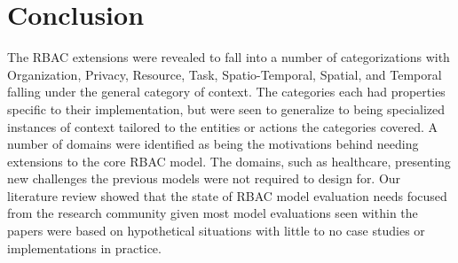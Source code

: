 \section{Conclusion} \label{sec:conclusion}

The RBAC extensions were revealed to fall into a number of categorizations with Organization, Privacy, Resource, Task, Spatio-Temporal, Spatial, and Temporal falling under the general category of context.
The categories each had properties specific to their implementation, but were seen to generalize to being specialized instances of context tailored to the entities or actions the categories covered.
A number of domains were identified as being the motivations behind needing extensions to the core RBAC model.  The domains, such as healthcare, presenting new challenges the previous models were not
required to design for.  Our literature review showed that the state of RBAC model evaluation needs focused from the research community given most model evaluations seen within the papers were
based on hypothetical situations with little to no case studies or implementations in practice.
